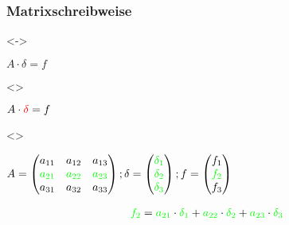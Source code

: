 \documentclass[xcolor=dvipsnames]{beamer}
\newcounter{firstElement}
\newcounter{secondElement}
\newcounter{fourthElement}
\newcounter{fifthElement}
\begin{document}
\begin{frame}[t]
  \frametitle{Matrixschreibweise}
  \only<\thefirstElement-\thefourthElement>{
    \centerline{
      $A \cdot \delta = f$}}
  \only<\thefifthElement>{
    \centerline{
      $A \cdot \textcolor{red}{\delta} = f$}}

  \only<\thesecondElement>{
    \vspace{2mm}
    \centerline{
      \begin{math}
        A =
        \begin{pmatrix}
          a_{11} & a_{12} & a_{13} \\
          \textcolor{green}{a_{21}} & \textcolor{green}{a_{22}} & \textcolor{green}{a_{23}} \\
          a_{31} & a_{32} & a_{33} \\
        \end{pmatrix}
        ;
        \delta =
        \begin{pmatrix}
          \textcolor{green}{\delta_1} \\
          \textcolor{green}{\delta_2} \\
          \textcolor{green}{\delta_3} \\
        \end{pmatrix}
        ;
        f =
        \begin{pmatrix}
          f_1 \\
          \textcolor{green}{f_2} \\
          f_3 \\
        \end{pmatrix}
      \end{math}}
    \begin{align*}
      \textcolor{green}{f_2} & = \textcolor{green}{a_{21}} \cdot \textcolor{green}{\delta_1} + \textcolor{green}{a_{22}} \cdot \textcolor{green}{\delta_2} + \textcolor{green}{a_{23}} \cdot \textcolor{green}{\delta_3} \\
    \end{align*}}


\end{frame}
\end{document}
